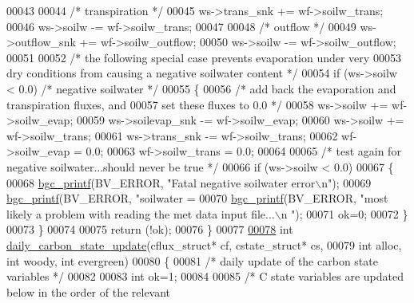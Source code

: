 \begin{DoxyCode}
00043     
00044     \textcolor{comment}{/* transpiration */}
00045     ws->trans\_snk      += wf->soilw\_trans;
00046     ws->soilw          -= wf->soilw\_trans;
00047     
00048     \textcolor{comment}{/* outflow */}
00049     ws->outflow\_snk    += wf->soilw\_outflow;
00050     ws->soilw          -= wf->soilw\_outflow;
00051     
00052     \textcolor{comment}{/* the following special case prevents evaporation under very}
00053 \textcolor{comment}{    dry conditions from causing a negative soilwater content */}
00054     \textcolor{keywordflow}{if} (ws->soilw < 0.0)        \textcolor{comment}{/* negative soilwater */}
00055     \{
00056         \textcolor{comment}{/* add back the evaporation and transpiration fluxes, and}
00057 \textcolor{comment}{        set these fluxes to 0.0 */}
00058         ws->soilw        += wf->soilw\_evap;
00059         ws->soilevap\_snk -= wf->soilw\_evap;
00060         ws->soilw        += wf->soilw\_trans;
00061         ws->trans\_snk    -= wf->soilw\_trans;
00062         wf->soilw\_evap = 0.0;
00063         wf->soilw\_trans = 0.0;
00064         
00065         \textcolor{comment}{/* test again for negative soilwater...should never be true */}
00066         \textcolor{keywordflow}{if} (ws->soilw < 0.0) 
00067         \{
00068             \hyperlink{bgc__io_8c_af287cce6e2aede1ce337de9319e80d0d}{bgc\_printf}(BV\_ERROR, \textcolor{stringliteral}{"Fatal negative soilwater error\(\backslash\)n"});
00069             \hyperlink{bgc__io_8c_af287cce6e2aede1ce337de9319e80d0d}{bgc\_printf}(BV\_ERROR, \textcolor{stringliteral}{"soilwater = %
00070             \hyperlink{bgc__io_8c_af287cce6e2aede1ce337de9319e80d0d}{bgc\_printf}(BV\_ERROR, \textcolor{stringliteral}{"most likely a problem with reading the met data input file...\(\backslash\)n
      "});
00071             ok=0;
00072         \}
00073     \}
00074     
00075     \textcolor{keywordflow}{return} (!ok);
00076 \}
00077 
\hypertarget{state__update_8c_source_l00078}{}\hyperlink{state__update_8c_ab0adc8a68a22b97c1eba81f5da03d555}{00078} \textcolor{keywordtype}{int} \hyperlink{state__update_8c_ab0adc8a68a22b97c1eba81f5da03d555}{daily\_carbon\_state\_update}(cflux\_struct* cf, cstate\_struct* cs,
00079 \textcolor{keywordtype}{int} alloc, \textcolor{keywordtype}{int} woody, \textcolor{keywordtype}{int} evergreen)
00080 \{
00081     \textcolor{comment}{/* daily update of the carbon state variables */}
00082     
00083     \textcolor{keywordtype}{int} ok=1;
00084     
00085     \textcolor{comment}{/* C state variables are updated below in the order of the relevant}
}
\end{DoxyCode}
